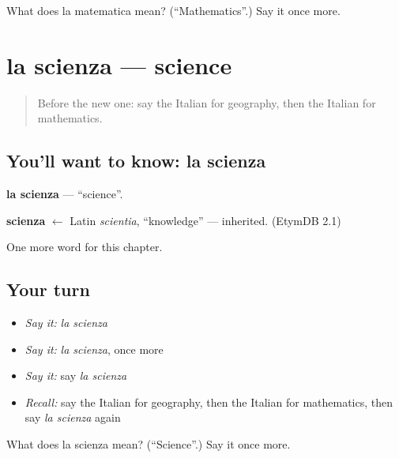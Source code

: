 \begin{tcolorbox}[breakable,colback=teal!4,colframe=teal!35!black,title={Before you move on}]
What does la matematica mean? (\textquotedblleft{}Mathematics\textquotedblright{}.) Say it once more.
\end{tcolorbox}
\section[la scienza]{la scienza — science}

\label{lesson:IT-C173-scienza}



\begin{quote}
Before the new one: say the Italian for geography, then the Italian for mathematics.
\end{quote}

\subsection*{You'll want to know: la scienza}
\textbf{la scienza} — \textquotedblleft{}science\textquotedblright{}.

\begin{cousinweb}
\textbf{scienza} $\leftarrow$ Latin \emph{scientia}, \textquotedblleft{}knowledge\textquotedblright{} — inherited. (EtymDB 2.1)
\end{cousinweb}

\begin{grammarlens}[title={What you've built}]
One more word for this chapter.
\end{grammarlens}

\subsection*{Your turn}
\begin{itemize}
\raggedright
  \item \emph{Say it:} \emph{la scienza}
  \item \emph{Say it:} \emph{la scienza}, once more
  \item \emph{Say it:} say \emph{la scienza}
  \item \emph{Recall:} say the Italian for geography, then the Italian for mathematics, then say \emph{la scienza} again
\end{itemize}

\begin{tcolorbox}[breakable,colback=teal!4,colframe=teal!35!black,title={Before you move on}]
What does la scienza mean? (\textquotedblleft{}Science\textquotedblright{}.) Say it once more.
\end{tcolorbox}
